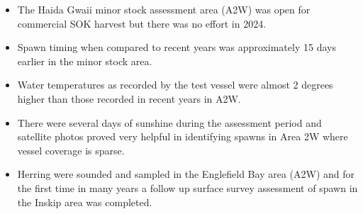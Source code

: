 \begin{itemize}

\item The Haida Gwaii minor stock assessment area (A2W)
was open for commercial SOK harvest but there was no effort in 2024.

\item Spawn timing when compared to recent years was approximately
15 days earlier in the minor stock area.

\item Water temperatures as recorded by the test vessel were almost
2 degrees higher than those recorded in recent years in A2W.

\item There were several days of sunshine during the assessment period
and satellite photos proved very helpful in identifying spawns
in Area 2W where vessel coverage is sparse.

\item Herring were sounded and sampled in the Englefield Bay area (A2W)
and for the first time in many years a follow up
surface survey assessment of spawn in the Inskip area was completed.

\end{itemize}